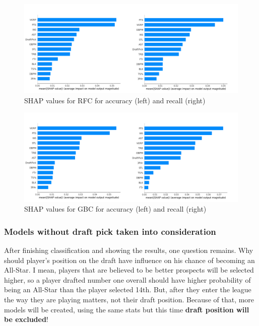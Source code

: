 \documentclass[a4paper]{article}
\begin{document}
\begin{figure}[h!]
\begin{center}
\includegraphics[scale=0.3]{rfc_shap.png}
\end{center}
\caption{SHAP values for RFC for accuracy (left) and recall (right)}
\label{plt:shap_rfc_all_star}
\end{figure}

\begin{figure}[h!]
\begin{center}
\includegraphics[scale=0.3]{gbc_shap.png}
\end{center}
\caption{SHAP values for GBC for accuracy (left) and recall (right)}
\label{plt:shap_gbc_all_star}
\end{figure}

\subsubsection{Models without draft pick taken into consideration}
\label{subsubsec:without_draft_pick_all_star}

After finishing classification and showing the results, one question remains. Why should player's position on the draft have influence on his chance of becoming an All-Star. I mean, players that are believed to be better prospects will be selected higher, so a player drafted number one overall should have higher probability of being an All-Star than the player selected 14th. But, after they enter the league the way they are playing matters, not their draft position. Because of that, more models will be created, using the same stats but this time \textbf{draft position will be excluded}!
\end{document}
